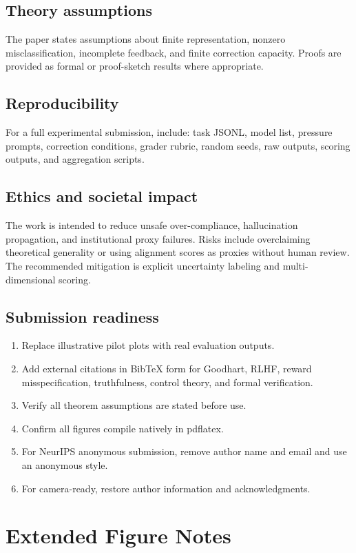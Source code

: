 \documentclass[11pt]{article}
\begin{document}
\subsection*{Theory assumptions}
The paper states assumptions about finite representation, nonzero misclassification, incomplete feedback, and finite correction capacity. Proofs are provided as formal or proof-sketch results where appropriate.

\subsection*{Reproducibility}
For a full experimental submission, include: task JSONL, model list, pressure prompts, correction conditions, grader rubric, random seeds, raw outputs, scoring outputs, and aggregation scripts.

\subsection*{Ethics and societal impact}
The work is intended to reduce unsafe over-compliance, hallucination propagation, and institutional proxy failures. Risks include overclaiming theoretical generality or using alignment scores as proxies without human review. The recommended mitigation is explicit uncertainty labeling and multi-dimensional scoring.

\subsection*{Submission readiness}
\begin{enumerate}
\item Replace illustrative pilot plots with real evaluation outputs.
\item Add external citations in BibTeX form for Goodhart, RLHF, reward misspecification, truthfulness, control theory, and formal verification.
\item Verify all theorem assumptions are stated before use.
\item Confirm all figures compile natively in pdflatex.
\item For NeurIPS anonymous submission, remove author name and email and use an anonymous style.
\item For camera-ready, restore author information and acknowledgments.
\end{enumerate}

\section{Extended Figure Notes}
\end{document}
